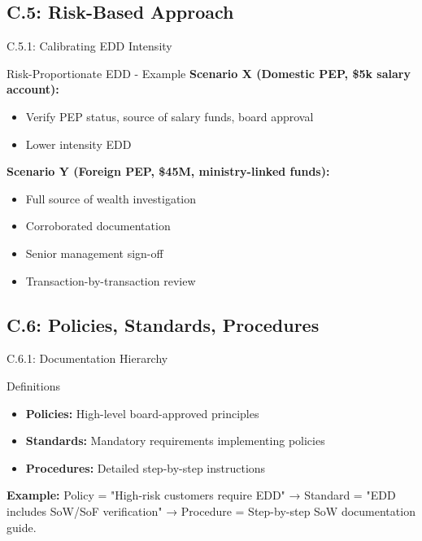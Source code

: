 \documentclass{beamer}
\begin{document}
	\subsection{C.5: Risk-Based Approach}
	
	\begin{frame}{C.5.1: Calibrating EDD Intensity}
		\begin{block}{Risk-Proportionate EDD - Example}
			\textbf{Scenario X (Domestic PEP, \$5k salary account):}
			\begin{itemize}
				\item Verify PEP status, source of salary funds, board approval
				\item Lower intensity EDD
			\end{itemize}
			\textbf{Scenario Y (Foreign PEP, \$45M, ministry-linked funds):}
			\begin{itemize}
				\item Full source of wealth investigation
				\item Corroborated documentation
				\item Senior management sign-off
				\item Transaction-by-transaction review
			\end{itemize}
		\end{block}
	\end{frame}
	
	\subsection{C.6: Policies, Standards, Procedures}
	
	\begin{frame}{C.6.1: Documentation Hierarchy}
		\begin{block}{Definitions}
			\begin{itemize}
				\item \textbf{Policies:} High-level board-approved principles
				\item \textbf{Standards:} Mandatory requirements implementing policies
				\item \textbf{Procedures:} Detailed step-by-step instructions
			\end{itemize}
		\end{block}
		\textbf{Example:} Policy = "High-risk customers require EDD" → Standard = "EDD includes SoW/SoF verification" → Procedure = Step-by-step SoW documentation guide.
	\end{frame}
	
\end{document}

